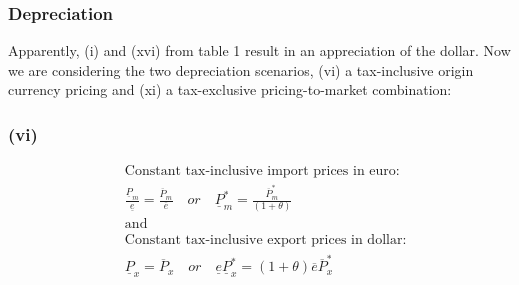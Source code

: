 \subsubsection{Depreciation}
Apparently, (i) and (xvi) from table 1 result in an appreciation of the dollar. Now we are considering the two depreciation scenarios, (vi) a tax-inclusive origin currency pricing and (xi) a tax-exclusive pricing-to-market combination:

\subsubsection*{(vi)}
\begin{equation}
\begin{aligned}
&\text{Constant tax-inclusive import prices in euro:}\\ &\frac{\underline P_m}{\underline e} = \frac{\overline P_m}{\overline e} \quad or \quad \underline P^*_m  = \frac{\overline P^*_m}{(1+\theta)} \\
&\text{and}\\
&\text{Constant tax-inclusive export prices in dollar:}\\ &\underline P_x = \overline P_x \quad or \quad \underline e \underline P_x^* = (1+\theta)\overline e \overline P^*_x
\end{aligned}
\end{equation}

